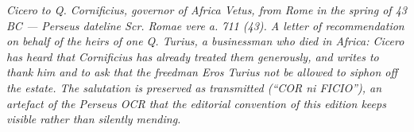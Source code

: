 
\textit{Cicero to Q. Cornificius, governor of Africa Vetus, from Rome in the
spring of 43 BC --- Perseus dateline \textit{Scr. Romae vere a. 711 (43)}.
A letter of recommendation on behalf of the heirs of one Q. Turius, a
businessman who died in Africa: Cicero has heard that Cornificius has
already treated them generously, and writes to thank him and to ask
that the freedman Eros Turius not be allowed to siphon off the estate.
The salutation is preserved as transmitted (``COR ni FICIO''), an
artefact of the Perseus OCR that the editorial convention of this
edition keeps visible rather than silently mending.}
